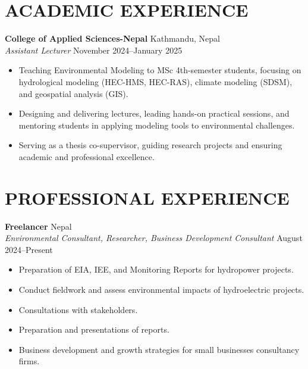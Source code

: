 \documentclass[a4paper, 09pt]{extarticle}
\begin{document}
\section*{ACADEMIC EXPERIENCE}
\noindent
\textbf{College of Applied Sciences-Nepal} \hfill Kathmandu, Nepal\\[2pt] 
\textit{Assistant Lecturer} \hfill November 2024--January 2025 
\begin{itemize}
    \item Teaching Environmental Modeling to MSc 4th-semester students, focusing on hydrological modeling (HEC-HMS, HEC-RAS), climate modeling (SDSM), and geospatial analysis (GIS).
    \item Designing and delivering lectures, leading hands-on practical sessions, and mentoring students in applying modeling tools to environmental challenges.
    \item Serving as a thesis co-supervisor, guiding research projects and ensuring academic and professional excellence.
\end{itemize}

\vspace{5pt}

\section*{PROFESSIONAL EXPERIENCE}
\noindent
\textbf{Freelancer} \hfill Nepal\\[2pt] 
\textit{Environmental Consultant, Researcher, Business Development Consultant} \hfill  August 2024--Present
\begin{itemize}
    \item Preparation of EIA, IEE, and Monitoring Reports for hydropower projects.
    \item Conduct fieldwork and assess environmental impacts of hydroelectric projects.
    \item Consultations with stakeholders.
    \item Preparation and presentations of reports.
    \item Business development and growth strategies for small businesses consultancy firms.
\end{itemize}
\end{document}

